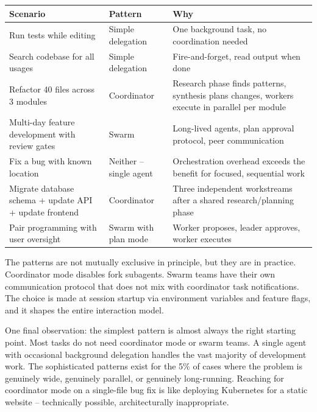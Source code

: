 \documentclass[
  english,
  11pt,
  letterpaper,
]{book}
\begin{document}
\begin{longtable}[]{@{}
  >{\raggedright\arraybackslash}p{}
  >{\raggedright\arraybackslash}p{}
  >{\raggedright\arraybackslash}p{}@{}}
\toprule\noalign{}
\begin{minipage}[b]{\linewidth}\raggedright
Scenario
\end{minipage} & \begin{minipage}[b]{\linewidth}\raggedright
Pattern
\end{minipage} & \begin{minipage}[b]{\linewidth}\raggedright
Why
\end{minipage} \\
\midrule\noalign{}
\endhead
\bottomrule\noalign{}
\endlastfoot
Run tests while editing & Simple delegation & One background task, no
coordination needed \\
Search codebase for all usages & Simple delegation & Fire-and-forget,
read output when done \\
Refactor 40 files across 3 modules & Coordinator & Research phase finds
patterns, synthesis plans changes, workers execute in parallel per
module \\
Multi-day feature development with review gates & Swarm & Long-lived
agents, plan approval protocol, peer communication \\
Fix a bug with known location & Neither -- single agent & Orchestration
overhead exceeds the benefit for focused, sequential work \\
Migrate database schema + update API + update frontend & Coordinator &
Three independent workstreams after a shared research/planning phase \\
Pair programming with user oversight & Swarm with plan mode & Worker
proposes, leader approves, worker executes \\
\end{longtable}

The patterns are not mutually exclusive in principle, but they are in
practice. Coordinator mode disables fork subagents. Swarm teams have
their own communication protocol that does not mix with coordinator task
notifications. The choice is made at session startup via environment
variables and feature flags, and it shapes the entire interaction model.

One final observation: the simplest pattern is almost always the right
starting point. Most tasks do not need coordinator mode or swarm teams.
A single agent with occasional background delegation handles the vast
majority of development work. The sophisticated patterns exist for the
5\% of cases where the problem is genuinely wide, genuinely parallel, or
genuinely long-running. Reaching for coordinator mode on a single-file
bug fix is like deploying Kubernetes for a static website -- technically
possible, architecturally inappropriate.
\end{document}
